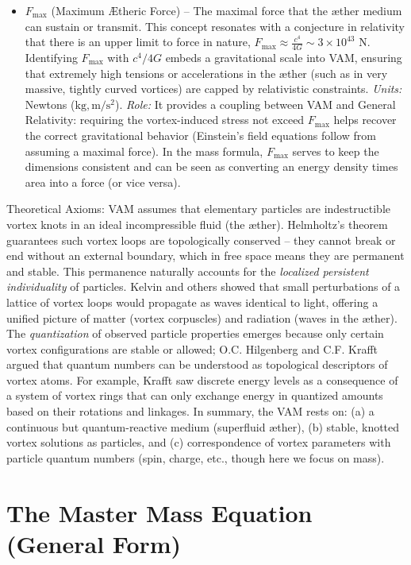 \begin{itemize}
\item
$F_{\max}$ (Maximum Ætheric Force) – The maximal force that the æther medium can sustain or transmit. This concept resonates with a conjecture in relativity that there is an upper limit to force in nature, $F_{\text{max}} \approx \frac{c^4}{4G} \sim 3\times10^{43}$ N. Identifying $F_{\max}$ with $c^4/4G$ embeds a gravitational scale into VAM, ensuring that extremely high tensions or accelerations in the æther (such as in very massive, tightly curved vortices) are capped by relativistic constraints. \textit{Units:} Newtons ($\mathrm{kg,m/s^2}$). \textit{Role:} It provides a coupling between VAM and General Relativity: requiring the vortex-induced stress not exceed $F_{\max}$ helps recover the correct gravitational behavior (Einstein’s field equations follow from assuming a maximal force). In the mass formula, $F_{\max}$ serves to keep the dimensions consistent and can be seen as converting an energy density times area into a force (or vice versa).

\end{itemize}

Theoretical Axioms: VAM assumes that elementary particles are indestructible vortex knots in an ideal incompressible fluid (the æther). Helmholtz’s theorem guarantees such vortex loops are topologically conserved – they cannot break or end without an external boundary, which in free space means they are permanent and stable. This permanence naturally accounts for the \textit{localized persistent individuality} of particles. Kelvin and others showed that small perturbations of a lattice of vortex loops would propagate as waves identical to light, offering a unified picture of matter (vortex corpuscles) and radiation (waves in the æther). The \textit{quantization} of observed particle properties emerges because only certain vortex configurations are stable or allowed; O.C. Hilgenberg and C.F. Krafft argued that quantum numbers can be understood as topological descriptors of vortex atoms. For example, Krafft saw discrete energy levels as a consequence of a system of vortex rings that can only exchange energy in quantized amounts based on their rotations and linkages. In summary, the VAM rests on: (a) a continuous but quantum-reactive medium (superfluid æther), (b) stable, knotted vortex solutions as particles, and (c) correspondence of vortex parameters with particle quantum numbers (spin, charge, etc., though here we focus on mass).\section*{The Master Mass Equation (General Form)}

